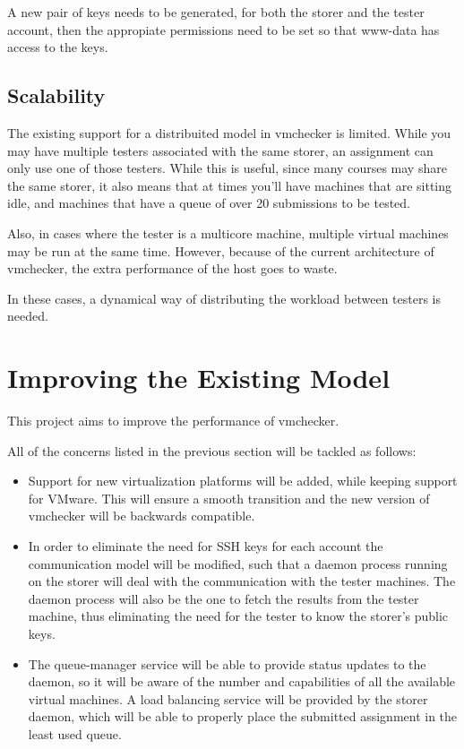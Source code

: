 A new pair of keys needs to be generated, for both the storer and the tester account,
then the appropiate permissions need to be set so that www-data has access to 
the keys.


\subsection{Scalability}
\label{sub-sec:vmc-analysis-scalability}

The existing support for a distribuited model in vmchecker is limited. While
you may have multiple testers associated with the same storer, an assignment
can only use one of those testers. While this is useful, since many courses
may share the same storer, it also means that at times you'll have machines
that are sitting idle, and machines that have a queue of over 20 submissions
to be tested.

Also, in cases where the tester is a multicore machine, multiple virtual
machines may be run at the same time. However, because of the current architecture 
of vmchecker, the extra performance of the host goes to waste.

In these cases, a dynamical way of distributing the workload between testers is 
needed.

\section{Improving the Existing Model}
\label{sec:vmc-improving}

This project aims to improve the performance of vmchecker. 

All of the concerns listed in the previous section will be tackled as follows:

\begin{itemize}
\item Support for new virtualization platforms will be added, while keeping support
for VMware. This will ensure a smooth transition and the new version of vmchecker
will be backwards compatible.
\item In order to eliminate the need for SSH keys for each account the communication
model will be modified, such that a daemon process running on the storer will
deal with the communication with the tester machines. The daemon process will also
be the one to fetch the results from the tester machine, thus eliminating the need
for the tester to know the storer's public keys.
\item The queue-manager service will be able to provide status updates to the daemon,
so it will be aware of the number and capabilities of all the available virtual
machines. A load balancing service will be provided by the storer daemon, which
will be able to properly place the submitted assignment in the least used queue.
\end{itemize}
